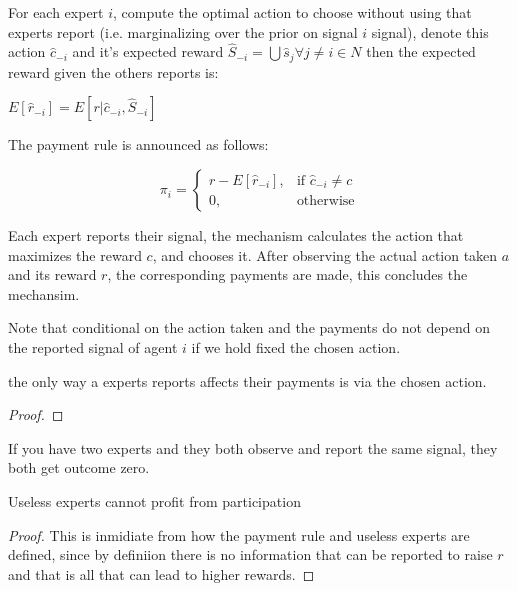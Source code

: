 \begin{mech}
For each expert $i$, compute the optimal action to choose without using that experts report (i.e. marginalizing over the prior on signal $i$ signal), denote this action $\hat{c}_{-i}$ and it's expected reward 
$\hat{S}_{-i} = \bigcup \hat{s}_j  \forall j \neq i \in N $ then the expected reward given the others reports is:

$E[\hat{r}_{-i}] = E[ r| \hat{c}_{-i}, \hat{S}_{-i}] $


 The payment rule is announced as follows:

\[
    \pi_i = 
\begin{cases}
    r - E[\hat{r}_{-i}] ,& \text{if } \hat{c}_{-i} \neq c\\
    0,              & \text{otherwise}
\end{cases}
\]

Each expert reports their signal, the mechanism calculates the action that maximizes the reward $c$, and chooses it. After observing the actual action taken $a$ and its reward $r$, the corresponding payments are made, this concludes the mechansim.

Note that conditional on the action taken and the payments do not depend on the reported signal of agent $i$ if we hold fixed the chosen action. 

\end{mech}

\begin{lem}
	the only way a experts reports affects their payments is via the chosen action.
\end{lem}

\begin{proof}
\end{proof}

\begin{eg}
	If you have two experts and they both observe and report the same signal, they both get outcome zero. 
\end{eg}


\begin{lem}
	Useless experts cannot profit from participation
\end{lem}

\begin{proof}
This is inmidiate from how the payment rule and useless experts are defined, since by definiion there is no information that can be reported to raise $r$ and that is all that can lead to higher rewards.
\end{proof}


